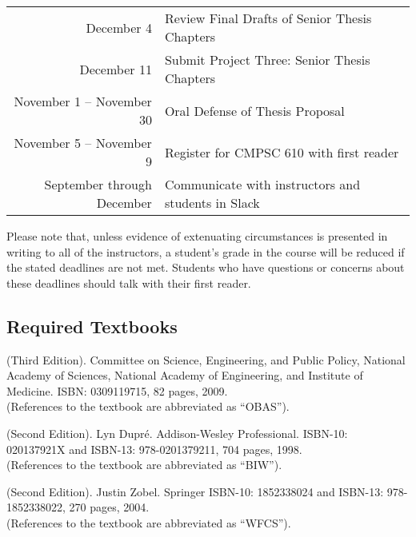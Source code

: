 \documentclass[11pt]{article}
\begin{document}
\begin{center}
\begin{longtable}{r|l}
December 4  & Review Final Drafts of Senior Thesis Chapters \\
December 11 & Submit Project Three: Senior Thesis Chapters   \\

\hline

November 1 -- November 30 & Oral Defense of Thesis Proposal          \\
November 5 -- November 9 & Register for CMPSC 610 with first reader \\

\hline

September through December & Communicate with instructors and students in Slack \\

\hline

\end{longtable}
\end{center}

\vspace*{-.25in}

\noindent Please note that, unless evidence of extenuating circumstances is presented in writing to all of the instructors, a student's grade in the course will be reduced if the stated deadlines are not met. Students who have questions or concerns about these deadlines should talk with their first reader.

\subsection*{Required Textbooks}

(Third Edition).  Committee on Science, Engineering, and Public Policy, National Academy of Sciences, National Academy of Engineering, and Institute of Medicine. ISBN: 0309119715, 82 pages, 2009.\\ (References to the textbook are abbreviated as ``OBAS'').

 (Second Edition). Lyn Dupr\'e.  Addison-Wesley Professional.  ISBN-10: 020137921X and ISBN-13: 978-0201379211, 704 pages, 1998.\\ (References to the textbook are abbreviated as ``BIW'').

 (Second Edition).  Justin Zobel. Springer ISBN-10: 1852338024 and ISBN-13: 978-1852338022, 270 pages, 2004. \\ (References to the textbook are abbreviated as ``WFCS'').
\end{document}
